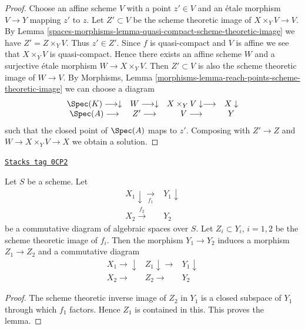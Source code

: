 \begin{proof}
Choose an affine scheme $V$ with a point $z' \in V$
and an \'etale morphism $V \to Y$ mapping $z'$ to $z$.
Let $Z' \subset V$ be the scheme theoretic image of $X \times_Y V \to V$.
By Lemma \ref{spaces-morphisms-lemma-quasi-compact-scheme-theoretic-image} we have
$Z' = Z \times_Y V$. Thus $z' \in Z'$.
Since $f$ is quasi-compact and $V$ is affine we see that
$X \times_Y V$ is quasi-compact. Hence
there exists an affine scheme $W$ and a surjective \'etale
morphism $W \to X \times_Y V$. Then $Z' \subset V$ is also the
scheme theoretic image of $W \to V$.
By Morphisms, Lemma \ref{morphisms-lemma-reach-points-scheme-theoretic-image}
we can choose a diagram
$$
\begin{array}{cccc}\Spec(K) \longrightarrow\downarrow & W \longrightarrow\downarrow & X \times_Y V \downarrow\longrightarrow & X \downarrow \\ \Spec(A) \longrightarrow & Z' \longrightarrow & V \longrightarrow & Y\end{array}
$$
such that the closed point of $\Spec(A)$ maps to $z'$.
Composing with $Z' \to Z$ and $W \to X \times_Y V \to X$
we obtain a solution.
\end{proof}

\begin{lemma}
\label{spaces-morphisms-lemma-factor-factor}
\href{https://stacks.math.columbia.edu/tag/0CP2}{\texttt{Stacks tag 0CP2}}

Let $S$ be a scheme. Let
$$
\begin{array}{cc}X_1 \downarrow\underset{f_1}{\longrightarrow} & Y_1 \downarrow \\ X_2 \overset{f_2}{\longrightarrow} & Y_2\end{array}
$$
be a commutative diagram of algebraic spaces over $S$.
Let $Z_i \subset Y_i$, $i = 1, 2$ be
the scheme theoretic image of $f_i$. Then the morphism
$Y_1 \to Y_2$ induces a morphism $Z_1 \to Z_2$ and a
commutative diagram
$$
\begin{array}{ccc}X_1 \longrightarrow\downarrow & Z_1 \downarrow\longrightarrow & Y_1 \downarrow \\ X_2 \longrightarrow & Z_2 \longrightarrow & Y_2\end{array}
$$
\end{lemma}

\begin{proof}
The scheme theoretic inverse image of $Z_2$ in $Y_1$
is a closed subspace of $Y_1$ through
which $f_1$ factors. Hence $Z_1$ is contained in this.
This proves the lemma.
\end{proof}


